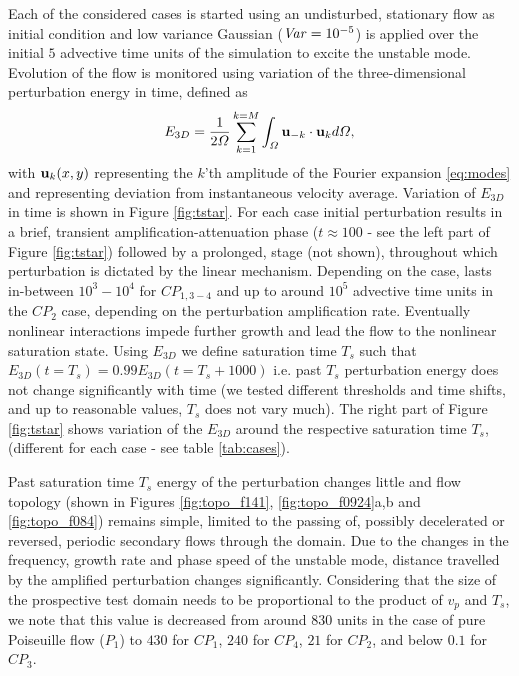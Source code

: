 \documentclass[lineno]{jfm}
\DeclareMathOperator{\Var}{\it Var}
\begin{document}
Each of the considered cases is started using an undisturbed, stationary flow as initial condition
and  low variance Gaussian  (${\Var}=10^{-5}$)  is applied over the initial $5$ advective time units of the simulation to excite the unstable mode.
Evolution of the flow is monitored using variation of the three-dimensional perturbation energy in time, defined as
\begin{equation}
E_{3D}=\frac{1}{2\Omega}\sum_{k=1}^{k=M} \int_\Omega {\bf u}_{-k}\cdot{\bf u}_kd\Omega,
\label{eq:e3d}
\end{equation}
with ${\bf u}_k(x,y)$ representing the $k$'th amplitude of the Fourier expansion \eqref{eq:modes}
and representing deviation from instantaneous   velocity average.
Variation of $E_{3D}$ in time is shown in Figure \ref{fig:tstar}.
For each case initial perturbation results in a brief, transient amplification-attenuation phase ($t\approx100$ - see the left part of Figure \ref{fig:tstar}) followed by a prolonged,
 stage  (not shown),
throughout which perturbation   is dictated by the linear mechanism.
Depending on the case,
lasts in-between $10^3-10^4$ for $CP_{1,3-4}$ and up to around $10^5$ advective time units in the $CP_2$ case, depending on the perturbation amplification rate.
Eventually nonlinear interactions impede further growth and lead the flow to the nonlinear saturation state.
Using $E_{3D}$ we define saturation time $T_s$ such that $E_{3D}(t=T_s)=0.99 E_{3D}(t=T_s+1000)$
i.e. past $T_s$ perturbation energy does not change significantly with time (we tested different thresholds and time shifts, and up to reasonable values, $T_s$ does not vary much).
The right part of Figure \ref{fig:tstar} shows variation of the $E_{3D}$ around the respective saturation time $T_s$, (different for each case - see table \ref{tab:cases}).

Past saturation time $T_s$ energy of the perturbation changes little and flow topology (shown in Figures \ref{fig:topo_f141}, \ref{fig:topo_f0924}a,b and \ref{fig:topo_f084}) remains simple, limited to the passing of, possibly decelerated or reversed, periodic secondary flows through the domain.
Due to the changes in the frequency, growth rate and phase speed of the unstable mode, distance travelled by the amplified perturbation changes significantly.
Considering that the size of the prospective test domain needs to be proportional to the product of $v_p$ and $T_s$,
we note that this value is decreased from around $830$ units in the case of pure Poiseuille flow ($P_1$) to $430$ for $CP_1$, $240$ for $CP_4$, $21$ for $CP_2$, and below $0.1$ for $CP_3$.
\end{document}
